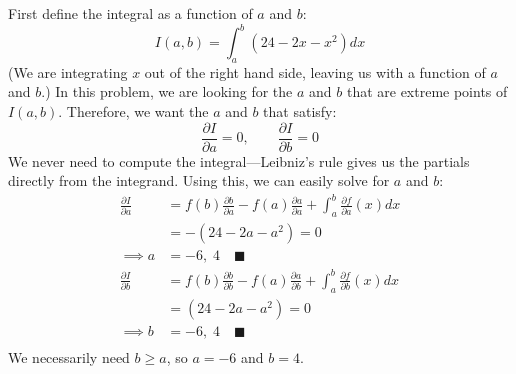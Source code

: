 \documentclass[letterpaper, 11pt]{article}
\begin{document}
\par First define the integral as a function of $a$ and $b$:
\[ I(a,b) = \int_a^b (24 - 2x - x^2)dx\]
(We are integrating $x$ out of the right hand side, leaving us with a function of $a$ and $b$.) In this problem, we are looking for the $a$ and $b$ that are extreme points of $I(a,b)$. Therefore, we want the $a$ and $b$ that satisfy: 
\[ \frac{\partial I}{\partial a} = 0, \qquad \frac{\partial I}{\partial b} = 0\]
We never need to compute the integral---Leibniz's rule gives us the partials directly from the integrand. Using this, we can easily solve for $a$ and $b$:
\begin{align*}
\frac{\partial I}{\partial a} &= f(b)\frac{\partial b }{\partial a} -  f(a)\frac{\partial a }{\partial a}  +  \int_{a}^{b} \frac{\partial f}{\partial a}(x)dx \\
&= - (24 - 2a - a^2) = 0\\
\implies a &= -6,\; 4 \quad\blacksquare \\
\frac{\partial I}{\partial b} &= f(b)\frac{\partial b }{\partial b} -  f(a)\frac{\partial a }{\partial b}  +  \int_{a}^{b} \frac{\partial f}{\partial b}(x)dx \\
&= (24 - 2a - a^2) = 0\\
\implies b &= -6,\; 4 \quad\blacksquare \\
\end{align*}
We necessarily need $b \geq a$, so $a = -6$ and $ b = 4$. 
\end{document}
